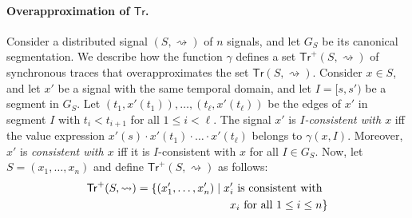 \documentclass[iicol,lineno]{sn-jnl}
\newcommand{\hb}{\rightsquigarrow}
\newcommand{\tr}{\mathsf{Tr}}
\newcommand{\B}{\mathbb{B}}
\newcommand{\?}{\text{?}}
\newcommand{\suchthat}{\;\ifnum\currentgrouptype=16 \middle\fi|\;}
\let\st\suchthat
\begin{document}
	
	
	
	\paragraph*{Overapproximation of $\tr$.}
	Consider a distributed signal $(S,{\hb})$ of $n$ signals, and let $G_S$ be its canonical segmentation.
	We describe how the function $\gamma$ defines a set $\tr^+(S,{\hb})$ of synchronous traces that overapproximates the set $\tr(S,{\hb})$.
	Consider $x \in S$, and let $x'$ be a signal with the same temporal domain, and let $I = [s, s')$ be a segment in $G_S$.
	Let $(t_1, x'(t_1)), \ldots, (t_\ell, x'(t_\ell))$ be the edges of $x'$ in segment $I$ with $t_i < t_{i+1}$ for all $1 \leq i < \ell$.
	The signal $x'$ is \emph{$I$-consistent with $x$} iff the value expression $x'(s) \cdot x'(t_1) \cdot \ldots \cdot x'(t_\ell)$ belongs to $\gamma(x,I)$.
	Moreover, $x'$ is \emph{consistent with $x$} iff it is $I$-consistent with $x$ for all $I \in G_S$.
	Now, let $S = (x_1, \ldots, x_n)$ and define $\tr^+(S,{\hb})$ as follows:
	\begin{align*}
		\tr^+(S,{\hb}) = \{ (x_1', \ldots, x_n') \st \text{$x_i'$ is consistent with}&\\
		\text{$x_i$ for all $1 \leq i \leq n$}&\} 
	\end{align*}
	
\end{document}
